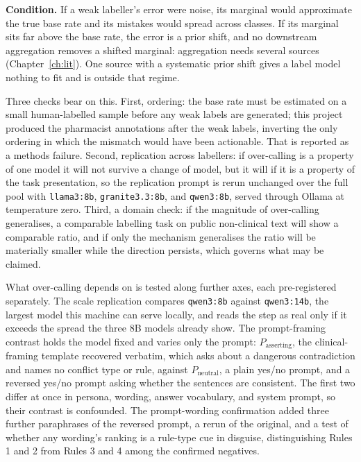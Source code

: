 \textbf{Condition.} If a weak labeller's error were noise, its marginal would approximate the true
base rate and its mistakes would spread across classes. If its marginal sits far above the base
rate, the error is a prior shift, and no downstream aggregation removes a shifted marginal:
aggregation needs several sources (Chapter~\ref{ch:lit}). One source with a systematic prior shift gives
a label model nothing to fit and is outside that regime.

Three checks bear on this. First, ordering: the base rate must be estimated on a small
human-labelled sample before any weak labels are generated; this project produced the pharmacist
annotations after the weak labels, inverting the only ordering in which the mismatch would have
been actionable. That is reported as a methods failure. Second,
replication across labellers: if over-calling is a property of one model it will not survive a
change of model, but it will if it is a property of the task presentation, so the replication prompt
is rerun unchanged over the full pool with \texttt{llama3:8b}, \texttt{granite3.3:8b}, and
\texttt{qwen3:8b}, served through Ollama at temperature zero. Third, a domain check: if the magnitude
of over-calling generalises, a comparable labelling task on public non-clinical text will show a
comparable ratio, and if only the mechanism generalises the ratio will be materially smaller while
the direction persists, which governs what may be claimed.

What over-calling depends on is tested along further axes, each pre-registered separately. The
scale replication compares \texttt{qwen3:8b} against \texttt{qwen3:14b}, the largest model this
machine can serve locally, and reads the step as real only if it exceeds the spread the three 8B
models already show. The prompt-framing contrast holds the model fixed and varies only the prompt:
$P_{\text{asserting}}$, the clinical-framing template recovered verbatim, which asks about a
dangerous contradiction and names no conflict type or rule, against $P_{\text{neutral}}$, a plain
yes/no prompt, and a reversed yes/no prompt asking whether the sentences are consistent. The first
two differ at once in persona, wording, answer vocabulary, and system prompt, so their contrast is
confounded. The prompt-wording confirmation added three further
paraphrases of the reversed prompt, a rerun of the original, and a test of whether any wording's ranking is a rule-type cue in disguise, distinguishing
Rules 1 and 2 from Rules 3 and 4 among the confirmed negatives.

